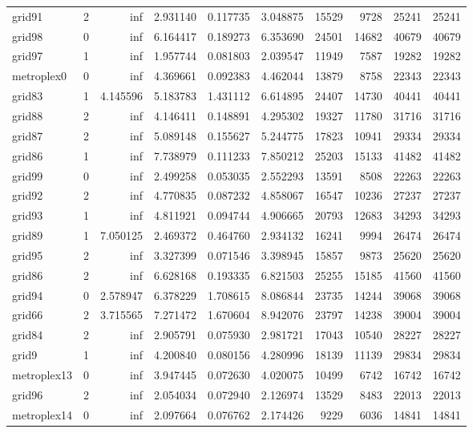 \begin{longtable}{|l|r|r|r|r|r|r|r|r|r|}
grid91 & 2 & inf & 2.931140 & 0.117735 & 3.048875 & 15529 & 9728 & 25241 & 25241 \\
grid98 & 0 & inf & 6.164417 & 0.189273 & 6.353690 & 24501 & 14682 & 40679 & 40679 \\
grid97 & 1 & inf & 1.957744 & 0.081803 & 2.039547 & 11949 & 7587 & 19282 & 19282 \\
metroplex0 & 0 & inf & 4.369661 & 0.092383 & 4.462044 & 13879 & 8758 & 22343 & 22343 \\
grid83 & 1 & 4.145596 & 5.183783 & 1.431112 & 6.614895 & 24407 & 14730 & 40441 & 40441 \\
grid88 & 2 & inf & 4.146411 & 0.148891 & 4.295302 & 19327 & 11780 & 31716 & 31716 \\
grid87 & 2 & inf & 5.089148 & 0.155627 & 5.244775 & 17823 & 10941 & 29334 & 29334 \\
grid86 & 1 & inf & 7.738979 & 0.111233 & 7.850212 & 25203 & 15133 & 41482 & 41482 \\
grid99 & 0 & inf & 2.499258 & 0.053035 & 2.552293 & 13591 & 8508 & 22263 & 22263 \\
grid92 & 2 & inf & 4.770835 & 0.087232 & 4.858067 & 16547 & 10236 & 27237 & 27237 \\
grid93 & 1 & inf & 4.811921 & 0.094744 & 4.906665 & 20793 & 12683 & 34293 & 34293 \\
grid89 & 1 & 7.050125 & 2.469372 & 0.464760 & 2.934132 & 16241 & 9994 & 26474 & 26474 \\
grid95 & 2 & inf & 3.327399 & 0.071546 & 3.398945 & 15857 & 9873 & 25620 & 25620 \\
grid86 & 2 & inf & 6.628168 & 0.193335 & 6.821503 & 25255 & 15185 & 41560 & 41560 \\
grid94 & 0 & 2.578947 & 6.378229 & 1.708615 & 8.086844 & 23735 & 14244 & 39068 & 39068 \\
grid66 & 2 & 3.715565 & 7.271472 & 1.670604 & 8.942076 & 23797 & 14238 & 39004 & 39004 \\
grid84 & 2 & inf & 2.905791 & 0.075930 & 2.981721 & 17043 & 10540 & 28227 & 28227 \\
grid9 & 1 & inf & 4.200840 & 0.080156 & 4.280996 & 18139 & 11139 & 29834 & 29834 \\
metroplex13 & 0 & inf & 3.947445 & 0.072630 & 4.020075 & 10499 & 6742 & 16742 & 16742 \\
grid96 & 2 & inf & 2.054034 & 0.072940 & 2.126974 & 13529 & 8483 & 22013 & 22013 \\
metroplex14 & 0 & inf & 2.097664 & 0.076762 & 2.174426 & 9229 & 6036 & 14841 & 14841 \\

\end{longtable}
